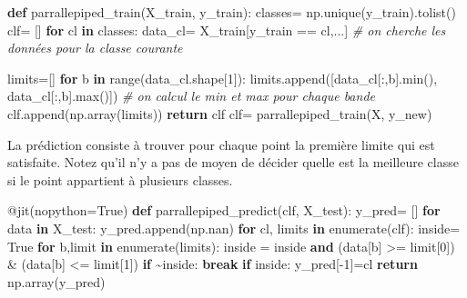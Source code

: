 \documentclass[
]{article}
\newenvironment{Shaded}{}{}
\newcommand{\AttributeTok}[1]{\textcolor[rgb]{0.49,0.56,0.16}{#1}}
\newcommand{\BuiltInTok}[1]{\textcolor[rgb]{0.00,0.50,0.00}{#1}}
\newcommand{\CommentTok}[1]{\textcolor[rgb]{0.38,0.63,0.69}{\textit{#1}}}
\newcommand{\ControlFlowTok}[1]{\textcolor[rgb]{0.00,0.44,0.13}{\textbf{#1}}}
\newcommand{\DecValTok}[1]{\textcolor[rgb]{0.25,0.63,0.44}{#1}}
\newcommand{\KeywordTok}[1]{\textcolor[rgb]{0.00,0.44,0.13}{\textbf{#1}}}
\newcommand{\NormalTok}[1]{#1}
\newcommand{\OperatorTok}[1]{\textcolor[rgb]{0.40,0.40,0.40}{#1}}
\newcommand{\VariableTok}[1]{\textcolor[rgb]{0.10,0.09,0.49}{#1}}
\begin{document}
\label{0b86c0d5}
\label{cb20}
\begin{Shaded}
\begin{Highlighting}[]
\KeywordTok{def}\NormalTok{ parrallepiped\_train(X\_train, y\_train):}
\NormalTok{  classes}\OperatorTok{=}\NormalTok{ np.unique(y\_train).tolist()}
\NormalTok{  clf}\OperatorTok{=}\NormalTok{ []}
  \ControlFlowTok{for}\NormalTok{ cl }\KeywordTok{in}\NormalTok{ classes:}
\NormalTok{      data\_cl}\OperatorTok{=}\NormalTok{ X\_train[y\_train }\OperatorTok{==}\NormalTok{ cl,...] }\CommentTok{\# on cherche les données pour la classe courante}
      
\NormalTok{      limits}\OperatorTok{=}\NormalTok{[]}
      \ControlFlowTok{for}\NormalTok{ b }\KeywordTok{in} \BuiltInTok{range}\NormalTok{(data\_cl.shape[}\DecValTok{1}\NormalTok{]):}
\NormalTok{        limits.append([data\_cl[:,b].}\BuiltInTok{min}\NormalTok{(), data\_cl[:,b].}\BuiltInTok{max}\NormalTok{()]) }\CommentTok{\# on calcul le min et max pour chaque bande}
\NormalTok{      clf.append(np.array(limits))}
  \ControlFlowTok{return}\NormalTok{ clf}
\NormalTok{clf}\OperatorTok{=}\NormalTok{ parrallepiped\_train(X, y\_new)}
\end{Highlighting}
\end{Shaded}

La prédiction consiste à trouver pour chaque point la première limite
qui est satisfaite. Notez qu'il n'y a pas de moyen de décider quelle est
la meilleure classe si le point appartient à plusieurs classes.

\label{0b0bd197}
\label{cb21}
\begin{Shaded}
\begin{Highlighting}[]
\AttributeTok{@jit}\NormalTok{(nopython}\OperatorTok{=}\VariableTok{True}\NormalTok{)}
\KeywordTok{def}\NormalTok{ parrallepiped\_predict(clf, X\_test):}
\NormalTok{  y\_pred}\OperatorTok{=}\NormalTok{ []}
  \ControlFlowTok{for}\NormalTok{ data }\KeywordTok{in}\NormalTok{ X\_test:}
\NormalTok{    y\_pred.append(np.nan)}
    \ControlFlowTok{for}\NormalTok{ cl, limits }\KeywordTok{in} \BuiltInTok{enumerate}\NormalTok{(clf):}
\NormalTok{      inside}\OperatorTok{=} \VariableTok{True}
      \ControlFlowTok{for}\NormalTok{ b,limit }\KeywordTok{in} \BuiltInTok{enumerate}\NormalTok{(limits):}
\NormalTok{        inside }\OperatorTok{=}\NormalTok{ inside }\KeywordTok{and}\NormalTok{ (data[b] }\OperatorTok{\textgreater{}=}\NormalTok{ limit[}\DecValTok{0}\NormalTok{]) }\OperatorTok{\&}\NormalTok{ (data[b] }\OperatorTok{\textless{}=}\NormalTok{ limit[}\DecValTok{1}\NormalTok{])}
        \ControlFlowTok{if} \OperatorTok{\textasciitilde{}}\NormalTok{inside:}
          \ControlFlowTok{break}
      \ControlFlowTok{if}\NormalTok{ inside:}
\NormalTok{        y\_pred[}\OperatorTok{{-}}\DecValTok{1}\NormalTok{]}\OperatorTok{=}\NormalTok{cl}
  \ControlFlowTok{return}\NormalTok{ np.array(y\_pred)}
\end{Highlighting}
\end{Shaded}
\end{document}
